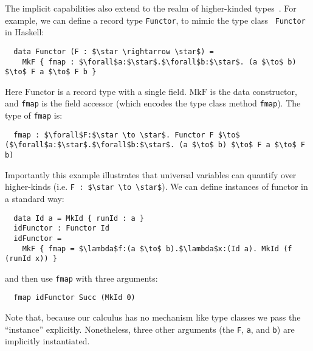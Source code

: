 The implicit capabilities also extend to the realm of higher-kinded types~\citep{tapl}.
For example, we can define a record type \lstinline{Functor},
to mimic the type class~\citep{typeclasseswadler,typeclasseskaes} \lstinline{Functor} in Haskell:
\newcommand{\Functor}[0]{\mathrm{Functor}}
\newcommand{\MkFunctor}[0]{\mathrm{MkF}}
\newcommand{\Id}[0]{\mathrm{Id}}
\newcommand{\MkId}[0]{\mathrm{MkId}}
\newcommand{\fmap}[0]{fmap}
\begin{lstlisting}
  data Functor (F : $\star \rightarrow \star$) =
    MkF { fmap : $\forall$a:$\star$.$\forall$b:$\star$. (a $\to$ b) $\to$ F a $\to$ F b }
\end{lstlisting}
\noindent Here $\Functor$ is a record type with a single field. $\MkFunctor$ is the data constructor,
and \lstinline{fmap} is the field accessor (which encodes the type class method \lstinline{fmap}).
The type of \lstinline{fmap} is:
\begin{lstlisting}
  fmap : $\forall$F:$\star \to \star$. Functor F $\to$ ($\forall$a:$\star$.$\forall$b:$\star$. (a $\to$ b) $\to$ F a $\to$ F b)
\end{lstlisting}
Importantly this example illustrates that universal variables can quantify over higher-kinds (i.e.
\lstinline{F : $\star \to \star$}).
We can define instances of functor in a standard way:
\begin{lstlisting}
  data Id a = MkId { runId : a }
  idFunctor : Functor Id
  idFunctor =
    MkF { fmap = $\lambda$f:(a $\to$ b).$\lambda$x:(Id a). MkId (f (runId x)) }
\end{lstlisting}
and then use \lstinline{fmap} with three arguments:
\begin{lstlisting}
  fmap idFunctor Succ (MkId 0)
\end{lstlisting}
\noindent Note that, because our calculus has no mechanism like type classes we pass the ``instance'' explicitly.
Nonetheless, three other arguments (the \lstinline{F}, \lstinline{a}, and \lstinline{b}) are implicitly instantiated.

